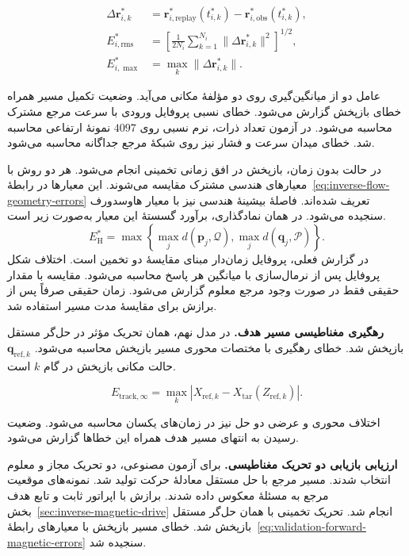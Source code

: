 \begin{equation}
\begin{aligned}
\Delta\mathbf r_{i,k}^*
&=\mathbf r_{i,\mathrm{replay}}^*(t_{i,k}^*)
 -\mathbf r_{i,\mathrm{obs}}^*(t_{i,k}^*),\\
E_{i,\mathrm{rms}}^*
&=\left[\frac1{2N_i}\sum_{k=1}^{N_i}
 \|\Delta\mathbf r_{i,k}^*\|^2\right]^{1/2},\\
E_{i,\max}^*&=\max_k\|\Delta\mathbf r_{i,k}^*\|.
\end{aligned}
\label{eq:validation-inverse-timed-path}
\end{equation}

عامل دو از میانگین‌گیری روی دو مؤلفهٔ مکانی می‌آید.
وضعیت تکمیل مسیر همراه خطای بازپخش گزارش می‌شود.
خطای نسبی پروفایل ورودی با سرعت مرجع مشترک محاسبه می‌شود.
در آزمون تعداد ذرات، نرم نسبی روی $4097$ نمونهٔ ارتفاعی محاسبه شد.
خطای میدان سرعت و فشار نیز روی شبکهٔ مرجع جداگانه محاسبه می‌شود.

در حالت بدون زمان، بازپخش در افق زمانی تخمینی انجام می‌شود.
هر دو روش با معیارهای هندسی مشترک مقایسه می‌شوند.
این معیارها در رابطهٔ~\eqref{eq:inverse-flow-geometry-errors} تعریف شده‌اند.
فاصلهٔ بیشینهٔ هندسی نیز با معیار هاوسدورف سنجیده می‌شود.
در همان نمادگذاری، برآورد گسستهٔ این معیار به‌صورت زیر است.
\[
E_{\mathrm H}^*=
\max\!\left\{
\max_j d(\mathbf p_j,\mathcal Q),
\max_j d(\mathbf q_j,\mathcal P)
\right\}.
\]
در گزارش فعلی، پروفایل زمان‌دار مبنای مقایسهٔ دو تخمین است.
اختلاف شکل پروفایل پس از نرمال‌سازی با میانگین هر پاسخ محاسبه می‌شود.
مقایسه با مقدار حقیقی فقط در صورت وجود مرجع معلوم گزارش می‌شود.
زمان حقیقی صرفاً پس از برازش برای مقایسهٔ مدت مسیر استفاده شد.

\textbf{رهگیری مغناطیسی مسیر هدف.}
در مدل نهم، همان تحریک مؤثر در حل‌گر مستقل  بازپخش شد.
خطای رهگیری با مختصات محوری مسیر بازپخش محاسبه می‌شود.
$\mathbf q_{\mathrm{ref},k}$ حالت مکانی بازپخش در گام $k$ است.

\begin{equation}
E_{\mathrm{track},\infty}
=\max_k
 |X_{\mathrm{ref},k}-X_{\mathrm{tar}}(Z_{\mathrm{ref},k})|.
\label{eq:validation-master9-tracking}
\end{equation}

اختلاف محوری و عرضی دو حل نیز در زمان‌های یکسان محاسبه می‌شود.
وضعیت رسیدن به انتهای مسیر هدف همراه این خطاها گزارش می‌شود.

\textbf{ارزیابی بازیابی دو تحریک مغناطیسی.}
برای آزمون مصنوعی، دو تحریک مجاز و معلوم انتخاب شدند.
مسیر مرجع با حل مستقل معادلهٔ حرکت تولید شد.
نمونه‌های موقعیت مرجع به مسئلهٔ معکوس داده شدند.
برازش با اپراتور ثابت و تابع هدف بخش~\ref{sec:inverse-magnetic-drive} انجام شد.
تحریک تخمینی با همان حل‌گر مستقل بازپخش شد.
خطای مسیر بازپخش با معیارهای رابطهٔ~\eqref{eq:validation-forward-magnetic-errors} سنجیده شد.

